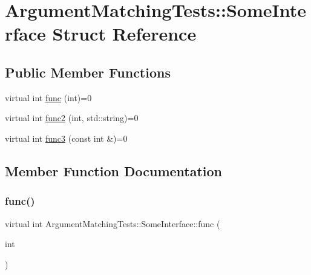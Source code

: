 \hypertarget{structArgumentMatchingTests_1_1SomeInterface}{}\section{Argument\+Matching\+Tests\+::Some\+Interface Struct Reference}
\label{structArgumentMatchingTests_1_1SomeInterface}
\subsection*{Public Member Functions}
\begin{DoxyCompactItemize}
\item 
virtual int \mbox{\hyperlink{structArgumentMatchingTests_1_1SomeInterface_af2de44f8bffd7f37366b10ef45331dc4}{func}} (int)=0
\item 
virtual int \mbox{\hyperlink{structArgumentMatchingTests_1_1SomeInterface_af048235577cfdf8c310b5002aa56b61a}{func2}} (int, std\+::string)=0
\item 
virtual int \mbox{\hyperlink{structArgumentMatchingTests_1_1SomeInterface_af1728034049767cbce3bc3ef052ec05b}{func3}} (const int \&)=0
\end{DoxyCompactItemize}


\subsection{Member Function Documentation}
\mbox{\label{structArgumentMatchingTests_1_1SomeInterface_af2de44f8bffd7f37366b10ef45331dc4}} 
\subsubsection{\texorpdfstring{func()}{func()}}
{\footnotesize\ttfamily virtual int Argument\+Matching\+Tests\+::\+Some\+Interface\+::func (\begin{DoxyParamCaption}\item[{int}]{ }\end{DoxyParamCaption})\hspace{0.3cm}{\ttfamily [pure virtual]}}

\mbox{\label{structArgumentMatchingTests_1_1SomeInterface_af048235577cfdf8c310b5002aa56b61a}} 
